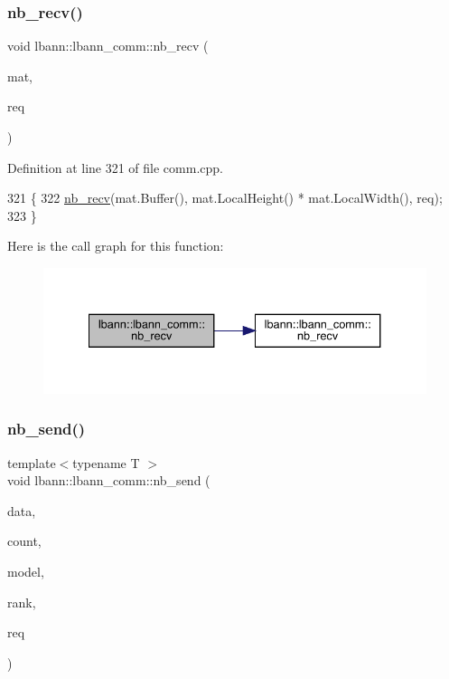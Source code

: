 \subsubsection{\texorpdfstring{nb\+\_\+recv()}{nb\_recv()}\hspace{0.1cm}{\footnotesize\ttfamily [9/9]}}
{\footnotesize\ttfamily void lbann\+::lbann\+\_\+comm\+::nb\+\_\+recv (\begin{DoxyParamCaption}\item[{\hyperlink{base_8hpp_a0fab5387556805cfeac3e7e567bf66c5}{Dist\+Mat} \&}]{mat,  }\item[{El\+::mpi\+::\+Request$<$ Data\+Type $>$ \&}]{req }\end{DoxyParamCaption})}



Definition at line 321 of file comm.\+cpp.


\begin{DoxyCode}
321                                                                   \{
322   \hyperlink{classlbann_1_1lbann__comm_aac24e8802602c73efddb455274e158f4}{nb\_recv}(mat.Buffer(), mat.LocalHeight() * mat.LocalWidth(), req);
323 \}
\end{DoxyCode}
Here is the call graph for this function\+:\nopagebreak
\begin{figure}[H]
\begin{center}
\leavevmode
\includegraphics[width=334pt]{classlbann_1_1lbann__comm_a105c0fa7997f23637cbd03d566748bca_cgraph}
\end{center}
\end{figure}
\mbox{\label{classlbann_1_1lbann__comm_a70679ca6477c56972f9bc53d52e5ce21}} 
\subsubsection{\texorpdfstring{nb\+\_\+send()}{nb\_send()}\hspace{0.1cm}{\footnotesize\ttfamily [1/6]}}
{\footnotesize\ttfamily template$<$typename T $>$ \\
void lbann\+::lbann\+\_\+comm\+::nb\+\_\+send (\begin{DoxyParamCaption}\item[{const T $\ast$}]{data,  }\item[{int}]{count,  }\item[{int}]{model,  }\item[{int}]{rank,  }\item[{El\+::mpi\+::\+Request$<$ T $>$ \&}]{req }\end{DoxyParamCaption})\hspace{0.3cm}{\ttfamily [inline]}}

